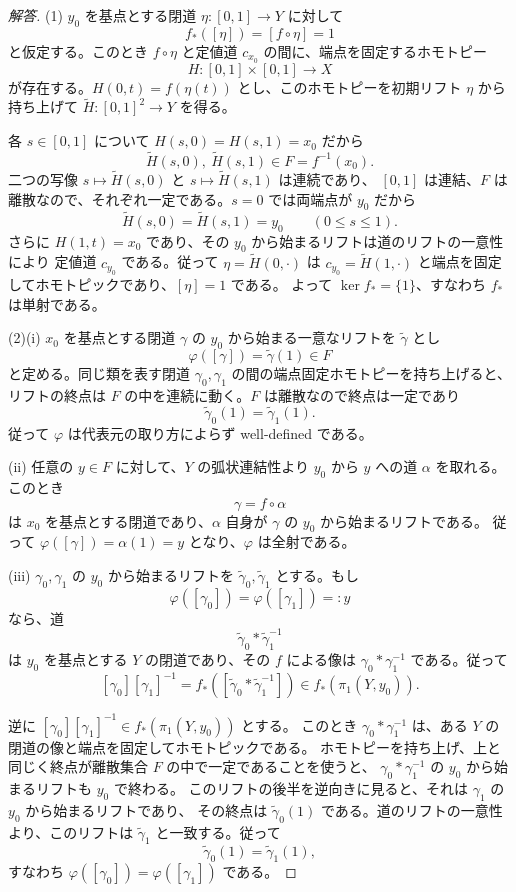 \begin{proof}[解答]
(1) $y_0$ を基点とする閉道 $\eta:[0,1]\to Y$ に対して
\[
f_*([\eta])=[f\circ\eta]=1
\]
と仮定する。このとき $f\circ\eta$ と定値道 $c_{x_0}$ の間に、端点を固定するホモトピー
\[
H:[0,1]\times[0,1]\to X
\]
が存在する。$H(0,t)=f(\eta(t))$ とし、このホモトピーを初期リフト $\eta$ から持ち上げて
$\widetilde H:[0,1]^2\to Y$ を得る。

各 $s\in[0,1]$ について $H(s,0)=H(s,1)=x_0$ だから
\[
\widetilde H(s,0),\ \widetilde H(s,1)\in F=f^{-1}(x_0).
\]
二つの写像 $s\mapsto\widetilde H(s,0)$ と $s\mapsto\widetilde H(s,1)$ は連続であり、
$[0,1]$ は連結、$F$ は離散なので、それぞれ一定である。$s=0$ では両端点が $y_0$ だから
\[
\widetilde H(s,0)=\widetilde H(s,1)=y_0
\qquad(0\le s\le1).
\]
さらに $H(1,t)=x_0$ であり、その $y_0$ から始まるリフトは道のリフトの一意性により
定値道 $c_{y_0}$ である。従って $\eta=\widetilde H(0,\cdot)$ は
$c_{y_0}=\widetilde H(1,\cdot)$ と端点を固定してホモトピックであり、$[\eta]=1$ である。
よって $\ker f_*=\{1\}$、すなわち $f_*$ は単射である。

(2)(i) $x_0$ を基点とする閉道 $\gamma$ の $y_0$ から始まる一意なリフトを
$\widetilde\gamma$ とし
\[
\varphi([\gamma])=\widetilde\gamma(1)\in F
\]
と定める。同じ類を表す閉道 $\gamma_0,\gamma_1$ の間の端点固定ホモトピーを持ち上げると、
リフトの終点は $F$ の中を連続に動く。$F$ は離散なので終点は一定であり
\[
\widetilde\gamma_0(1)=\widetilde\gamma_1(1).
\]
従って $\varphi$ は代表元の取り方によらず well-defined である。

(ii) 任意の $y\in F$ に対して、$Y$ の弧状連結性より
$y_0$ から $y$ への道 $\alpha$ を取れる。このとき
\[
\gamma=f\circ\alpha
\]
は $x_0$ を基点とする閉道であり、$\alpha$ 自身が $\gamma$ の $y_0$ から始まるリフトである。
従って $\varphi([\gamma])=\alpha(1)=y$ となり、$\varphi$ は全射である。

(iii) $\gamma_0,\gamma_1$ の $y_0$ から始まるリフトを
$\widetilde\gamma_0,\widetilde\gamma_1$ とする。もし
\[
\varphi([\gamma_0])=\varphi([\gamma_1])=:y
\]
なら、道
\[
\widetilde\gamma_0*\widetilde\gamma_1^{-1}
\]
は $y_0$ を基点とする $Y$ の閉道であり、その $f$ による像は
$\gamma_0*\gamma_1^{-1}$ である。従って
\[
[\gamma_0][\gamma_1]^{-1}
=f_*([\widetilde\gamma_0*\widetilde\gamma_1^{-1}])
\in f_*(\pi_1(Y,y_0)).
\]

逆に $[\gamma_0][\gamma_1]^{-1}\in f_*(\pi_1(Y,y_0))$ とする。
このとき $\gamma_0*\gamma_1^{-1}$ は、ある $Y$ の閉道の像と端点を固定してホモトピックである。
ホモトピーを持ち上げ、上と同じく終点が離散集合 $F$ の中で一定であることを使うと、
$\gamma_0*\gamma_1^{-1}$ の $y_0$ から始まるリフトも $y_0$ で終わる。
このリフトの後半を逆向きに見ると、それは $\gamma_1$ の $y_0$ から始まるリフトであり、
その終点は $\widetilde\gamma_0(1)$ である。道のリフトの一意性より、このリフトは
$\widetilde\gamma_1$ と一致する。従って
\[
\widetilde\gamma_0(1)=\widetilde\gamma_1(1),
\]
すなわち $\varphi([\gamma_0])=\varphi([\gamma_1])$ である。
\end{proof}

